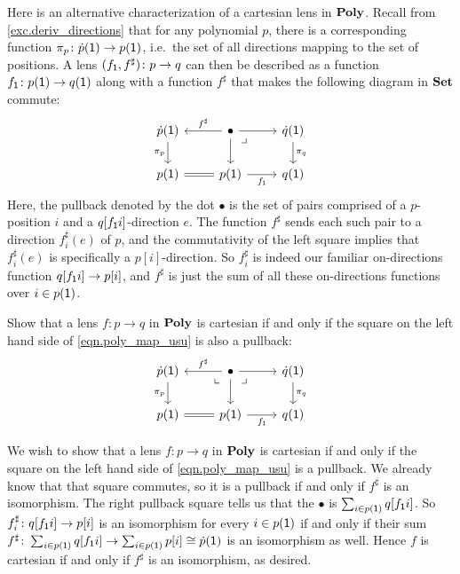\documentclass[Book-Poly]{subfiles}
\begin{document}
Here is an alternative characterization of a cartesian lens in $\mathbf{Poly}$.
Recall from \cref{exc.deriv_directions} that for any polynomial $p$, there is a corresponding function $\pi_p\colon\dot{p}(\textsf{1})\to p(\textsf{1})$, i.e.\ the set of all directions mapping to the set of positions.
A lens $(f_{\textsf{1}},f^\sharp)\colon p\to q$ can then be described as a function $f_{\textsf{1}}\colon p(\textsf{1})\to q(\textsf{1})$ along with a function $f^\sharp$ that makes the following diagram in $\mathbf{Set}$ commute:
\begin{equation}\label{eqn.poly_map_usu}
\begin{tikzcd}
	\dot{p}(\1)\ar[d, "\pi_p"']&
	\bullet\ar[l, "f^\sharp"']\ar[r]\ar[d]&
	\dot{q}(\1)\ar[d, "\pi_q"]\\
	p(\1)\ar[r, equal]&
	p(\1)\ar[r, "f_\1"']&
	q(\1)\ar[ul, phantom, very near end, "\lrcorner"]
\end{tikzcd}
\end{equation}
Here, the pullback denoted by the dot $\bullet$ is the set of pairs comprised of a $p$-position $i$ and a $q[f_{\textsf{1}}i]$-direction $e$.
The function $f^\sharp$ sends each such pair to a direction $f^\sharp_i(e)$ of $p$, and the commutativity of the left square implies that $f^\sharp_i(e)$ is specifically a $p[i]$-direction.
So $f^\sharp_i$ is indeed our familiar on-directions function $q[f_{\textsf{1}}i]\to p[i]$, and $f^\sharp$ is just the sum of all these on-directions functions over $i\in p(\textsf{1})$.

\begin{exercise} \label{exc.cart_pullbacks}
Show that a lens $f\colon p\to q$ in $\mathbf{Poly}$ is cartesian if and only if the square on the left hand side of \eqref{eqn.poly_map_usu} is also a pullback:
\[
\begin{tikzcd}
	\dot{p}(\1)\ar[d, "\pi_p"']&
	\bullet\ar[l, "f^\sharp"']\ar[r]\ar[d]&
	\dot{q}(\1)\ar[d, "\pi_q"]\\
	p(\1)\ar[r, equal]\ar[ur, phantom, very near end, "\llcorner"]&
	p(\1)\ar[r, "f_\1"']&
	q(\1)\ar[ul, phantom, very near end, "\lrcorner"]
\end{tikzcd}
\]
\begin{solution}
We wish to show that a lens $f\colon p\to q$ in $\mathbf{Poly}$ is cartesian if and only if the square on the left hand side of \eqref{eqn.poly_map_usu} is a pullback.
We already know that that square commutes, so it is a pullback if and only if $f^\sharp$ is an isomorphism.
The right pullback square tells us that the $\bullet$ is $\sum_{i\in p(\textsf{1})}q[f_{\textsf{1}}i]$.
So $f^\sharp_i\colon q[f_{\textsf{1}}i]\to p[i]$ is an isomorphism for every $i\in p(\textsf{1})$ if and only if their sum $f^\sharp\colon\sum_{i\in p(\textsf{1})}q[f_{\textsf{1}}i]\to\sum_{i\in p(\textsf{1})}p[i]\cong\dot{p}(\textsf{1})$ is an isomorphism as well.
Hence $f$ is cartesian if and only if $f^\sharp$ is an isomorphism, as desired.
\end{solution}
\end{exercise}
\end{document}
